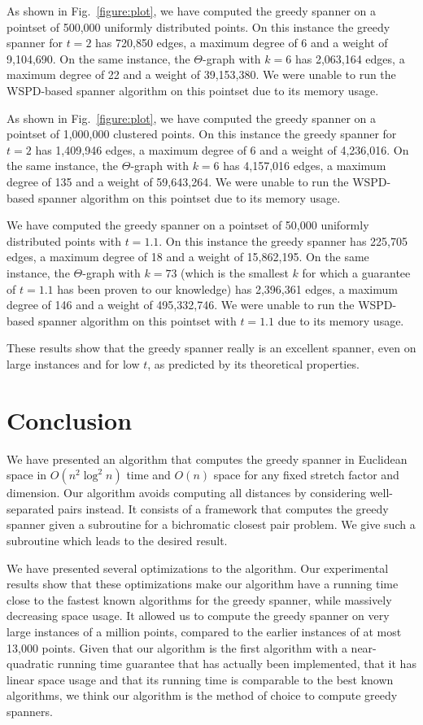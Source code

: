 \documentclass[runningheads,envcountsame,oribibl,orivec]{llncs}
\begin{document}
As shown in Fig.~\ref{figure:plot}, we have computed the greedy spanner on a pointset of 500,000 uniformly distributed points. On this instance the greedy spanner for $t=2$ has 720,850 edges, a maximum degree of 6 and a weight of 9,104,690. On the same instance, the $\Theta$-graph with $k=6$ has 2,063,164 edges, a maximum degree of 22 and a weight of 39,153,380. We were unable to run the WSPD-based spanner algorithm on this pointset due to its memory usage.

As shown in Fig.~\ref{figure:plot}, we have computed the greedy spanner on a pointset of 1,000,000 clustered points. On this instance the greedy spanner for $t=2$ has 1,409,946 edges, a maximum degree of 6 and a weight of 4,236,016. On the same instance, the $\Theta$-graph with $k=6$ has 4,157,016 edges, a maximum degree of 135 and a weight of 59,643,264. We were unable to run the WSPD-based spanner algorithm on this pointset due to its memory usage.

We have computed the greedy spanner on a pointset of 50,000 uniformly distributed points with $t=1.1$. On this instance the greedy spanner has 225,705 edges, a maximum degree of 18 and a weight of 15,862,195. On the same instance, the $\Theta$-graph with $k=73$ (which is the smallest $k$ for which a guarantee of $t=1.1$ has been proven to our knowledge) has 2,396,361 edges, a maximum degree of 146 and a weight of 495,332,746. We were unable to run the WSPD-based spanner algorithm on this pointset with $t=1.1$ due to its memory usage.

These results show that the greedy spanner really is an excellent spanner, even on large instances and for low $t$, as predicted by its theoretical properties.

\section{Conclusion}

We have presented an algorithm that computes the greedy spanner in Euclidean space in $O(n^2 \log^2 n)$ time and $O(n)$ space for any fixed stretch factor and dimension. Our algorithm avoids computing all distances by considering well-separated pairs instead. It consists of a framework that computes the greedy spanner given a subroutine for a bichromatic closest pair problem. We give such a subroutine which leads to the desired result.

We have presented several optimizations to the algorithm. Our experimental results show that these optimizations make our algorithm have a running time close to the fastest known algorithms for the greedy spanner, while massively decreasing space usage. It allowed us to compute the greedy spanner on very large  instances of a million points, compared to the earlier instances of at most 13,000 points. Given that our algorithm is the first algorithm with a near-quadratic running time guarantee that has actually been implemented, that it has linear space usage and that its running time is comparable to the best known algorithms, we think our algorithm is the method of choice to compute greedy spanners.
\end{document}
